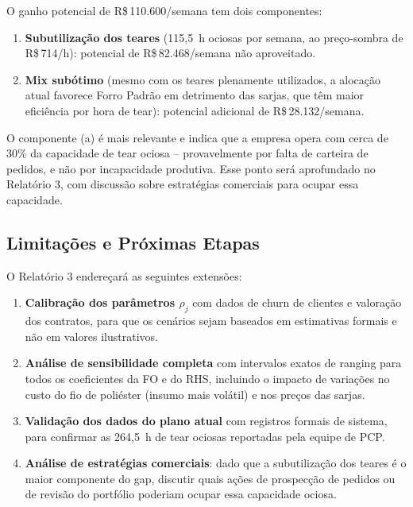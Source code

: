 O ganho potencial de R\$\,110.600/semana tem dois componentes:

\begin{enumerate}[label=\textbf{(\alph*)}]
  \item \textbf{Subutilização dos teares} (115,5~h ociosas por semana, ao preço-sombra
        de R\$\,714/h): potencial de R\$\,82.468/semana não aproveitado.

  \item \textbf{Mix subótimo} (mesmo com os teares plenamente utilizados, a alocação
        atual favorece Forro Padrão em detrimento das sarjas, que têm maior
        eficiência por hora de tear): potencial adicional de R\$\,28.132/semana.
\end{enumerate}

O componente (a) é mais relevante e indica que a empresa opera com cerca de
30\% da capacidade de tear ociosa -- provavelmente por falta de carteira de
pedidos, e não por incapacidade produtiva. Esse ponto será aprofundado no
Relatório 3, com discussão sobre estratégias comerciais para ocupar essa capacidade.

\subsection{Limitações e Próximas Etapas}

O Relatório 3 endereçará as seguintes extensões:

\begin{enumerate}[label=\textbf{(\roman*)}]
  \item \textbf{Calibração dos parâmetros $\rho_j$} com dados de churn de clientes
        e valoração dos contratos, para que os cenários sejam baseados em
        estimativas formais e não em valores ilustrativos.

  \item \textbf{Análise de sensibilidade completa} com intervalos exatos de ranging
        para todos os coeficientes da FO e do RHS, incluindo o impacto de variações
        no custo do fio de poliéster (insumo mais volátil) e nos preços das sarjas.

  \item \textbf{Validação dos dados do plano atual} com registros formais de sistema,
        para confirmar as 264,5~h de tear ociosas reportadas pela equipe de PCP.

  \item \textbf{Análise de estratégias comerciais}: dado que a subutilização dos
        teares é o maior componente do gap, discutir quais ações de prospecção de
        pedidos ou de revisão do portfólio poderiam ocupar essa capacidade ociosa.
\end{enumerate}

\newpage
